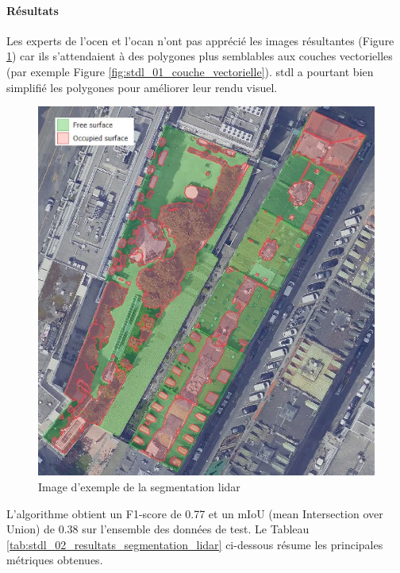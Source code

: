 {{{\paragraph{Résultats}
\par{Les experts de l'\acrshort{ocen} et l'\acrshort{ocan} n'ont pas apprécié les images résultantes (Figure \ref{fig:stdl_05_exemple_segmentation_lidar}) car ils s'attendaient à des polygones plus semblables aux couches vectorielles (par exemple Figure \ref{fig:stdl_01_couche_vectorielle}). \acrshort{stdl} a pourtant bien simplifié les polygones pour améliorer leur rendu visuel.}
\begin{figure}[H]
    \centering
    \includegraphics[width=1\linewidth]{02-main//figures/stdl_05_exemple_segmentation_lidar.png}
    \caption{Image d’exemple de la segmentation \gls{lidar} \cite{herny_detection_2024}}
    \label{fig:stdl_05_exemple_segmentation_lidar}
\end{figure}
\newpage
\par{L'algorithme obtient un F1-score de 0.77 et un mIoU (mean Intersection over Union) de 0.38 sur l'ensemble des données de test. Le Tableau \ref{tab:stdl_02_resultats_segmentation_lidar} ci-dessous résume les principales métriques obtenues.}
\begin{table}[H]

\end{table}}}}
